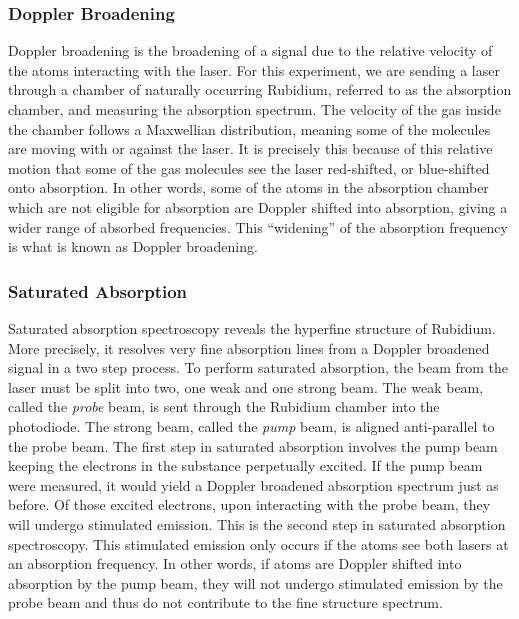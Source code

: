 \documentclass[12pt]{article}
\begin{document}
	\subsubsection*{Doppler Broadening}
	Doppler broadening is the broadening of a signal due to the relative velocity of the atoms interacting with the laser. For this experiment, we are sending a laser through a chamber of naturally occurring Rubidium, referred to as the absorption chamber, and measuring the absorption spectrum. The velocity of the gas inside the chamber follows a Maxwellian distribution, meaning some of the molecules are moving with or against the laser. It is precisely this because of this relative motion that some of the gas molecules see the laser red-shifted, or blue-shifted onto absorption. In other words, some of the atoms in the absorption chamber which are not eligible for absorption are Doppler shifted into absorption, giving a wider range of absorbed frequencies. This ``widening'' of the absorption frequency is what is known as Doppler broadening.
	
	\subsubsection*{Saturated Absorption}
	Saturated absorption spectroscopy reveals the hyperfine structure of Rubidium. More precisely, it resolves very fine absorption lines from a Doppler broadened signal in a two step process. To perform saturated absorption, the beam from the laser must be split into two, one weak and one strong beam. The weak beam, called the \emph{probe} beam, is sent through the Rubidium chamber into the photodiode. The strong beam, called the \emph{pump} beam, is aligned anti-parallel to the probe beam. The first step in saturated absorption involves the pump beam keeping the electrons in the substance perpetually excited. If the pump beam were measured, it would yield a Doppler broadened absorption spectrum just as before. Of those excited electrons, upon interacting with the probe beam, they will undergo stimulated emission. This is the second step in saturated absorption spectroscopy. This stimulated emission only occurs if the atoms see both lasers at an absorption frequency. In other words, if atoms are Doppler shifted into absorption by the pump beam, they will not undergo stimulated emission by the probe beam and thus do not contribute to the fine structure spectrum.
	
\end{document}
